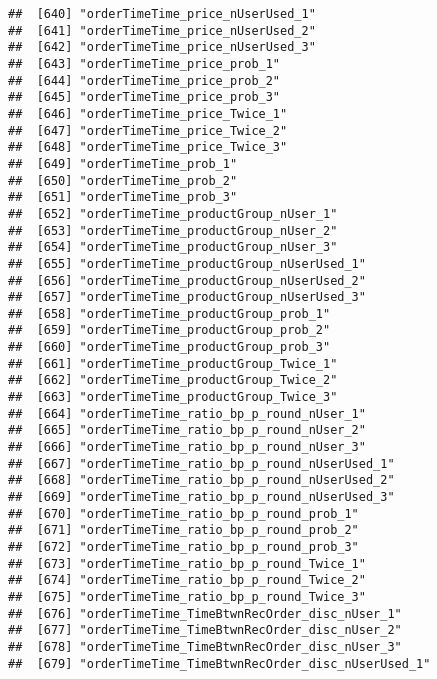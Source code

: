 \documentclass[10pt]{report}
\begin{document}
\begin{verbatim}
##  [640] "orderTimeTime_price_nUserUsed_1"                      
##  [641] "orderTimeTime_price_nUserUsed_2"                      
##  [642] "orderTimeTime_price_nUserUsed_3"                      
##  [643] "orderTimeTime_price_prob_1"                           
##  [644] "orderTimeTime_price_prob_2"                           
##  [645] "orderTimeTime_price_prob_3"                           
##  [646] "orderTimeTime_price_Twice_1"                          
##  [647] "orderTimeTime_price_Twice_2"                          
##  [648] "orderTimeTime_price_Twice_3"                          
##  [649] "orderTimeTime_prob_1"                                 
##  [650] "orderTimeTime_prob_2"                                 
##  [651] "orderTimeTime_prob_3"                                 
##  [652] "orderTimeTime_productGroup_nUser_1"                   
##  [653] "orderTimeTime_productGroup_nUser_2"                   
##  [654] "orderTimeTime_productGroup_nUser_3"                   
##  [655] "orderTimeTime_productGroup_nUserUsed_1"               
##  [656] "orderTimeTime_productGroup_nUserUsed_2"               
##  [657] "orderTimeTime_productGroup_nUserUsed_3"               
##  [658] "orderTimeTime_productGroup_prob_1"                    
##  [659] "orderTimeTime_productGroup_prob_2"                    
##  [660] "orderTimeTime_productGroup_prob_3"                    
##  [661] "orderTimeTime_productGroup_Twice_1"                   
##  [662] "orderTimeTime_productGroup_Twice_2"                   
##  [663] "orderTimeTime_productGroup_Twice_3"                   
##  [664] "orderTimeTime_ratio_bp_p_round_nUser_1"               
##  [665] "orderTimeTime_ratio_bp_p_round_nUser_2"               
##  [666] "orderTimeTime_ratio_bp_p_round_nUser_3"               
##  [667] "orderTimeTime_ratio_bp_p_round_nUserUsed_1"           
##  [668] "orderTimeTime_ratio_bp_p_round_nUserUsed_2"           
##  [669] "orderTimeTime_ratio_bp_p_round_nUserUsed_3"           
##  [670] "orderTimeTime_ratio_bp_p_round_prob_1"                
##  [671] "orderTimeTime_ratio_bp_p_round_prob_2"                
##  [672] "orderTimeTime_ratio_bp_p_round_prob_3"                
##  [673] "orderTimeTime_ratio_bp_p_round_Twice_1"               
##  [674] "orderTimeTime_ratio_bp_p_round_Twice_2"               
##  [675] "orderTimeTime_ratio_bp_p_round_Twice_3"               
##  [676] "orderTimeTime_TimeBtwnRecOrder_disc_nUser_1"          
##  [677] "orderTimeTime_TimeBtwnRecOrder_disc_nUser_2"          
##  [678] "orderTimeTime_TimeBtwnRecOrder_disc_nUser_3"          
##  [679] "orderTimeTime_TimeBtwnRecOrder_disc_nUserUsed_1"      

\end{verbatim}
\end{document}
